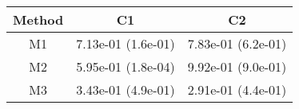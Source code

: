 \begin{tabular}{ccc}
\toprule
Method&C1&C2\tabularnewline
\midrule
M1& 7.13e-01 (1.6e-01)& 7.83e-01 (6.2e-01)\tabularnewline
M2& 5.95e-01 (1.8e-04)& 9.92e-01 (9.0e-01)\tabularnewline
M3& 3.43e-01 (4.9e-01)& 2.91e-01 (4.4e-01)\tabularnewline
\bottomrule
\end{tabular}
